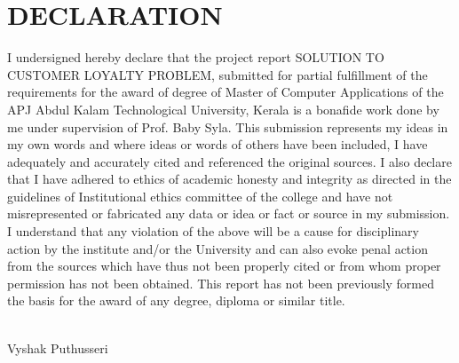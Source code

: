 \chapter*{\rm \large \bf DECLARATION}
\vspace{4.0mm}
\setlength{\parindent}{6em}
I undersigned hereby declare that the project report
SOLUTION TO CUSTOMER LOYALTY PROBLEM, submitted for partial
fulfillment of the requirements for the award of degree of Master of Computer Applications
of the APJ Abdul Kalam Technological University, Kerala is a bonafide work done
by me under supervision of Prof. Baby Syla. This submission represents my
ideas in my own words and where ideas or words of others have been included, I
have adequately and accurately cited and referenced the original sources. I also
declare that I have adhered to ethics of academic honesty and integrity as directed in the guidelines of Institutional ethics committee of the college and have not misrepresented or fabricated any data or idea or fact or source in my
submission. I understand that any violation of the above will be a cause for
disciplinary action by the institute and/or the University and can also evoke
penal action from the sources which have thus not been properly cited or from
whom proper permission has not been obtained. This report has not been
previously formed the basis for the award of any degree, diploma or similar
title.

\vspace{0.3 cm}

\\
\hfill {Vyshak Puthusseri}\\

\newpage 
